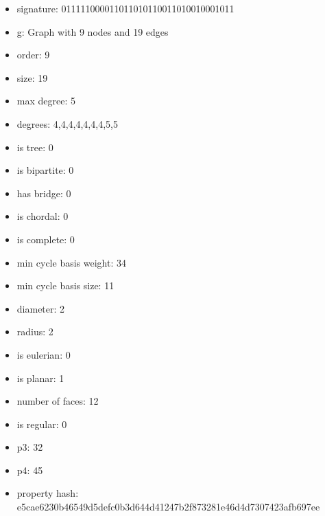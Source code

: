 \newpage
\begin{figure}
\end{figure}
\begin{itemize}
\item signature: 011111000011011010110011010010001011
\item g: Graph with 9 nodes and 19 edges
\item order: 9
\item size: 19
\item max degree: 5
\item degrees: 4,4,4,4,4,4,4,5,5
\item is tree: 0
\item is bipartite: 0
\item has bridge: 0
\item is chordal: 0
\item is complete: 0
\item min cycle basis weight: 34
\item min cycle basis size: 11
\item diameter: 2
\item radius: 2
\item is eulerian: 0
\item is planar: 1
\item number of faces: 12
\item is regular: 0
\item p3: 32
\item p4: 45
\item property hash: e5cae6230b46549d5defc0b3d644d41247b2f873281e46d4d7307423afb697ee
\end{itemize}
